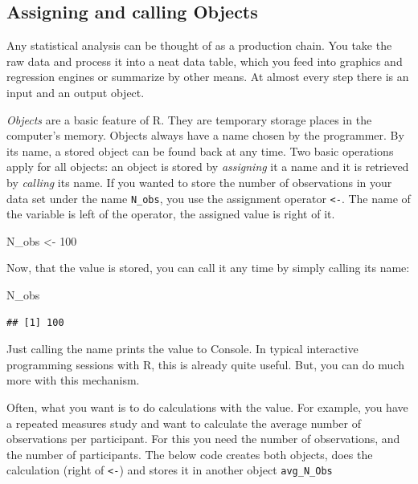 \documentclass[]{svmono}
\newenvironment{Shaded}{\begin{snugshade}}{\end{snugshade}}
\newcommand{\DecValTok}[1]{\textcolor[rgb]{0.00,0.00,0.81}{#1}}
\newcommand{\StringTok}[1]{\textcolor[rgb]{0.31,0.60,0.02}{#1}}
\newcommand{\NormalTok}[1]{#1}
\theoremstyle{definition}
\theoremstyle{definition}
\theoremstyle{definition}
\theoremstyle{remark}
\begin{document}
\subsection{Assigning and calling
Objects}\label{assigning-and-calling-objects}

Any statistical analysis can be thought of as a production chain. You
take the raw data and process it into a neat data table, which you feed
into graphics and regression engines or summarize by other means. At
almost every step there is an input and an output object.

\emph{Objects} are a basic feature of R. They are temporary storage
places in the computer's memory. Objects always have a name chosen by
the programmer. By its name, a stored object can be found back at any
time. Two basic operations apply for all objects: an object is stored by
\emph{assigning} it a name and it is retrieved by \emph{calling} its
name. If you wanted to store the number of observations in your data set
under the name \texttt{N\_obs}, you use the assignment operator
\texttt{\textless{}-}. The name of the variable is left of the operator,
the assigned value is right of it.

\begin{Shaded}
\begin{Highlighting}[]
\NormalTok{N_obs <-}\StringTok{ }\DecValTok{100}
\end{Highlighting}
\end{Shaded}

Now, that the value is stored, you can call it any time by simply
calling its name:

\begin{Shaded}
\begin{Highlighting}[]
\NormalTok{N_obs}
\end{Highlighting}
\end{Shaded}

\begin{verbatim}
## [1] 100
\end{verbatim}

Just calling the name prints the value to Console. In typical
interactive programming sessions with R, this is already quite useful.
But, you can do much more with this mechanism.

Often, what you want is to do calculations with the value. For example,
you have a repeated measures study and want to calculate the average
number of observations per participant. For this you need the number of
observations, and the number of participants. The below code creates
both objects, does the calculation (right of \texttt{\textless{}-}) and
stores it in another object \texttt{avg\_N\_Obs}
\end{document}
